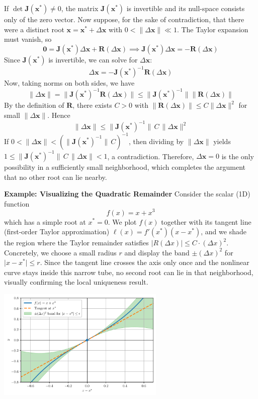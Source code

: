If \(\det \mathbf J(\mathbf x^*)\neq 0\), the matrix \(\mathbf J(\mathbf x^*)\) is invertible and its null-space consists only of the zero vector.  Now suppose, for the sake of contradiction, that there were a distinct root \(\mathbf x=\mathbf x^*+\Delta\mathbf x\) with \(0<\|\Delta\mathbf x\|\ll1\).  The Taylor expansion must vanish, so
\[
\mathbf{0} = \mathbf J(\mathbf x^*) \Delta\mathbf x + \mathbf{R}(\Delta\mathbf x) \implies
\mathbf J(\mathbf x^*) \Delta\mathbf x = - \mathbf{R}(\Delta\mathbf x)
\]
Since \(\mathbf J(\mathbf x^*)\) is invertible, we can solve for \(\Delta\mathbf x\):
\[
\Delta\mathbf x = - \mathbf J(\mathbf x^*)^{-1} \mathbf{R}(\Delta\mathbf x)
\]
Now, taking norms on both sides, we have
\[
\|\Delta\mathbf x\|
=\bigl\|\mathbf J(\mathbf x^*)^{-1}\mathbf{R}(\Delta\mathbf x)\bigr\|
\le \bigl\|\mathbf J(\mathbf x^*)^{-1}\bigr\|\bigl\|\mathbf{R}(\Delta\mathbf x)\bigr\|
\]
By the definition of $\mathbf R$, there exists $C>0$ with
$\|\mathbf R(\Delta\mathbf x)\|\le C\|\Delta\mathbf x\|^2$ for small $\|\Delta\mathbf x\|$.
Hence
\[
\|\Delta\mathbf x\|
\le \|\mathbf J(\mathbf x^*)^{-1}\|\,C\,\|\Delta\mathbf x\|^2
\]
If $0<\|\Delta\mathbf x\|<(\|\mathbf J(\mathbf x^*)^{-1}\|\,C)^{-1}$, then dividing by $\|\Delta\mathbf x\|$ yields $1\le \|\mathbf J(\mathbf x^*)^{-1}\|\,C\,\|\Delta\mathbf x\|<1$, a contradiction. Therefore, $\Delta\mathbf x=0$ is the only possibility in a sufficiently small neighborhood, which completes the argument that no other root can lie nearby.

\begin{exampleBox}
\textbf{Example: Visualizing the Quadratic Remainder}
Consider the scalar (1D) function
\[
f(x) = x + x^3
\]
which has a simple root at \(x^*=0\).  We plot \(f(x)\) together with its tangent line (first-order Taylor approximation)
\(\ell(x)=f'(x^*)(x-x^*)\), and we shade the region where the Taylor remainder satisfies
\(\lvert R(\Delta x)\rvert \le C \cdot (\Delta x)^2\).  Concretely, we choose a small radius \(r\) and display
the band \(\pm(\Delta x)^2\) for \(\lvert x-x^*\rvert\le r\).  Since the tangent line crosses the axis
only once and the nonlinear curve stays inside this narrow tube, no second root can lie in that
neighborhood, visually confirming the local uniqueness result.

\begin{center}
    \includegraphics[width=0.6\textwidth]{figs/nle/tangent_band.pdf}
\end{center}
\end{exampleBox}

